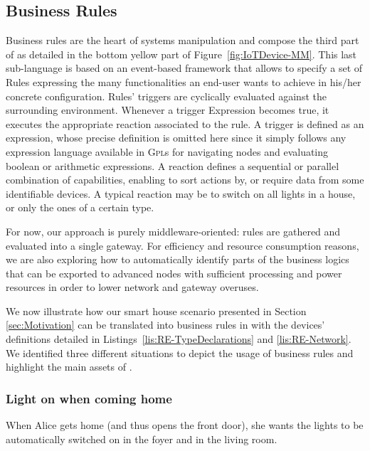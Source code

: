 \subsection{Business Rules}
\label{sec:IoTDSL-BusinessRules}

Business rules are the heart of \IOT systems manipulation and compose the third part of \IOTDSL as detailed in the bottom yellow part of Figure~\ref{fig:IoTDevice-MM}. This last sub-language is based on an event-based framework that allows to specify a set of \textsf{Rule}s expressing the many functionalities an end-user wants to achieve in his/her concrete configuration. Rules' \textsf{trigger}s are cyclically evaluated against the surrounding environment. Whenever a \textsf{trigger} \textsf{Expression} becomes true, it executes the appropriate \textsf{reaction} associated to the rule. A \textsf{trigger} is defined as an expression, whose precise definition is omitted here since it simply follows any expression language available in \textsc{Gpl}s for navigating nodes and evaluating boolean or arithmetic expressions. A \textsf{reaction} defines a sequential or parallel combination of capabilities, enabling to sort actions by, or require data from some identifiable devices. A typical \textsf{reaction} may be to switch on all lights in a house, or only the ones of a certain type.

For now, our approach is purely middleware-oriented: rules are gathered and evaluated into a single gateway. For efficiency and resource consumption reasons, we are also exploring how to automatically identify parts of the business logics that can be exported to advanced nodes with sufficient processing and power resources in order to lower network and gateway overuses.

We now illustrate how our smart house scenario presented in Section \ref{sec:Motivation} can be translated into business rules in \IOTDSL with the devices' definitions detailed in Listings~\ref{lis:RE-TypeDeclarations} and \ref{lis:RE-Network}. We identified three different situations to depict the usage of business rules and highlight the main assets of \IOTDSL.

\subsubsection*{Light on when coming home}

When Alice gets home (and thus opens the front door), she wants the lights to be automatically switched on in the foyer and in the living room.


